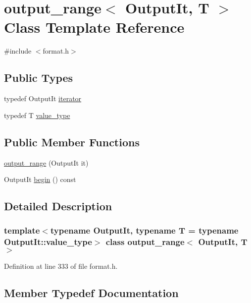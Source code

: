 \hypertarget{classoutput__range}{}\section{output\+\_\+range$<$ Output\+It, T $>$ Class Template Reference}
\label{classoutput__range}


{\ttfamily \#include $<$format.\+h$>$}

\subsection*{Public Types}
\begin{DoxyCompactItemize}
\item 
typedef Output\+It \hyperlink{classoutput__range_ad58eda348d78f3d205ed58a632d75a83}{iterator}
\item 
typedef T \hyperlink{classoutput__range_ab3ee3872c59d389b7128f7ef89e1ae79}{value\+\_\+type}
\end{DoxyCompactItemize}
\subsection*{Public Member Functions}
\begin{DoxyCompactItemize}
\item 
\hyperlink{classoutput__range_ad9f5067f83a39225fa306dce63e9262d}{output\+\_\+range} (Output\+It it)
\item 
Output\+It \hyperlink{classoutput__range_ac870e85d80e636c0304e3a9994901dec}{begin} () const
\end{DoxyCompactItemize}


\subsection{Detailed Description}
\subsubsection*{template$<$typename Output\+It, typename T = typename Output\+It\+::value\+\_\+type$>$\newline
class output\+\_\+range$<$ Output\+It, T $>$}



Definition at line 333 of file format.\+h.



\subsection{Member Typedef Documentation}
\mbox{\label{classoutput__range_ad58eda348d78f3d205ed58a632d75a83}} 
